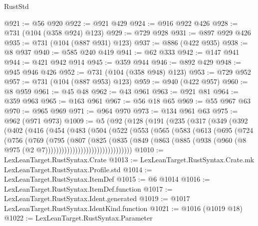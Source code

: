 \begin{lexlean}{RustStd}
\begin{coremodule}
{\begin{coremodule}
{{{{{{{{{{{{{{{{{{{{{{{{{{{{{{{{{{{@921 := @56 @920
@922 := @921 @429
@924 := @916 @922 @426
@928 := @731 (@104 (@358 @924) @123)
@929 := @729 @928
@931 := @897 @929 @426
@935 := @731 (@104 (@887 @931) @123)
@937 := @886 (@422 @935)
@938 := @8 @937
@940 := @585 @240 @419
@941 := @62 @333
@942 := @147 @941
@944 := @421 @942 @914
@945 := @359 @944
@946 := @892 @429
@948 := @945 @946 @426
@952 := @731 (@104 (@358 @948) @123)
@953 := @729 @952
@957 := @731 (@104 (@887 @953) @123)
@959 := @940 (@422 @957)
@960 := @8 @959
@961 := @45 @48
@962 := @43 @961
@963 := @921 @81
@964 := @359 @963
@965 := @163 @961
@967 := @56 @18 @65
@969 := @55 @967 @63
@970 := @965 @969
@971 := @964 @970
@973 := @134 @961 @63
@975 := @962 (@971 @973)
@1009 := @5
    (@92
      (@128
        (@191
          (@235
            (@317
              (@349
                (@392
                  (@402
                    (@416
                      (@454
                        (@483
                          (@504
                            (@522
                              (@553
                                (@565
                                  (@583
                                    (@613
                                      (@695
                                        (@724
                                          (@756
                                            (@769
                                              (@795
                                                (@807
                                                  (@825
                                                    (@835
                                                      (@849
                                                        (@863
                                                          (@885
                                                            (@938
                                                              (@960
                                                                (@8
                                                                  @975
                                                                  (@2
                                                                    @7))))))))))))))))))))))))))))))))
@1010 := LexLeanTarget.RustSyntax.Crate
@1013 := LexLeanTarget.RustSyntax.Crate.mk LexLeanTarget.RustSyntax.Profile.std
@1014 := LexLeanTarget.RustSyntax.ItemDef
@1015 := @6 @1014
@1016 := LexLeanTarget.RustSyntax.ItemDef.function
@1017 := LexLeanTarget.RustSyntax.Ident.generated
@1019 := @1017 LexLeanTarget.RustSyntax.IdentKind.function
@1021 := @1016 (@1019 @18)
@1022 := LexLeanTarget.RustSyntax.Parameter
}}}}}}}}}}}}}}}}}}}}}}}}}}}}}}}}}}}
\end{coremodule}}
\end{coremodule}
\end{lexlean}
